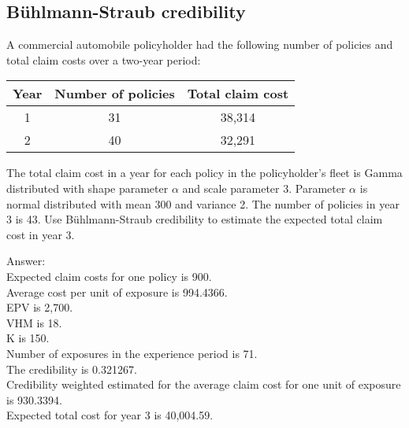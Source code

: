 \documentclass[11pt,a4paper,onecolumn]{article}
\begin{document}
\subsection{B\"{u}hlmann-Straub credibility}
 A commercial automobile policyholder had the following number of policies and total claim costs over a two-year period:
	\begin{table}[H]
		\centering
		\begin{tabular}{ccc}
			\hline
			Year & Number of policies & Total claim cost\\
			\hline
			1 & 31 & 38,314\\
			2 & 40 & 32,291\\
			\hline
		\end{tabular}
	\end{table}
The total claim cost in a year for each policy in the policyholder’s fleet is Gamma distributed with shape parameter $\alpha$ and scale parameter 3. Parameter $\alpha$ is normal distributed with mean 300 and variance 2. The number of policies in year 3 is 43. Use B\"{u}hlmann-Straub credibility to estimate the expected total claim cost in year 3.\par
Answer:\\
Expected claim costs for one policy is 900. \\
Average cost per unit of exposure is 994.4366.\\
EPV is 2,700.\\
VHM is 18.\\
K is 150.\\
Number of exposures in the experience period is 71.\\
The credibility is 0.321267.\\
Credibility weighted estimated for the average claim cost for one unit of exposure is 930.3394.\\
Expected total cost for year 3 is 40,004.59.
\end{document}
